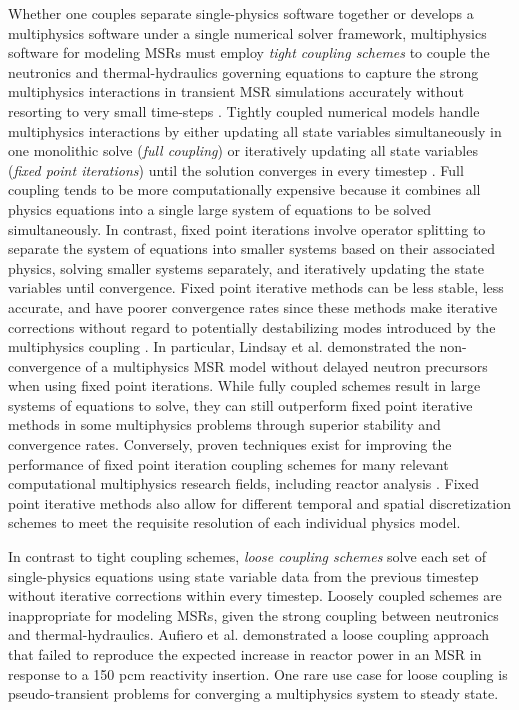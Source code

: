 Whether one couples separate single-physics software together or develops a multiphysics software
under a single numerical solver framework, multiphysics software for modeling \glspl{MSR} must
employ \textit{tight coupling schemes} to couple the neutronics and thermal-hydraulics governing
equations to capture the strong multiphysics interactions in transient \gls{MSR} simulations
accurately without resorting to very small time-steps \cite{aufiero_development_2014}. Tightly
coupled numerical models handle multiphysics interactions by either updating all state
variables simultaneously in one monolithic solve (\textit{full coupling}) or
iteratively updating all state variables (\textit{fixed point iterations})
until the solution converges in every timestep \cite{keyes_multiphysics_2013}.
Full coupling tends to be more computationally expensive because it combines
all physics equations into a single large system of equations to be solved
simultaneously. In contrast, fixed point iterations involve operator splitting to
separate the system of equations into smaller systems based on their associated
physics, solving smaller systems separately, and iteratively updating the state
variables until convergence. Fixed point iterative methods can be less
stable, less accurate, and have poorer
convergence rates since these methods make iterative corrections
without regard to potentially destabilizing modes introduced by the
multiphysics coupling \cite{keyes_multiphysics_2013}. In particular, Lindsay et al.
\cite{lindsay_introduction_2018} demonstrated the non-convergence of a multiphysics \gls{MSR}
model without delayed neutron precursors when using fixed point iterations. While fully coupled
schemes result in large systems of equations to solve, they can still outperform fixed point
iterative methods in some multiphysics problems through superior stability and convergence rates.
Conversely, proven techniques exist for improving the performance of fixed point iteration coupling
schemes for many relevant computational multiphysics research fields, including reactor analysis
\cite{ragusa_consistent_2009}. Fixed point iterative methods also allow for different temporal and
spatial discretization schemes to meet the requisite resolution of each
individual physics model.

In contrast to tight coupling schemes, \textit{loose coupling schemes}
solve each set of single-physics equations using state variable
data from the previous timestep without iterative corrections within every
timestep. Loosely coupled schemes are inappropriate for modeling \glspl{MSR},
given the strong coupling between neutronics and thermal-hydraulics.
Aufiero et al. \cite{aufiero_development_2014} demonstrated a loose coupling
approach that failed to reproduce the expected increase in reactor power
in an \gls{MSR} in response to a 150 pcm reactivity insertion. One rare use case for loose
coupling is pseudo-transient problems for converging a multiphysics system to steady state.

